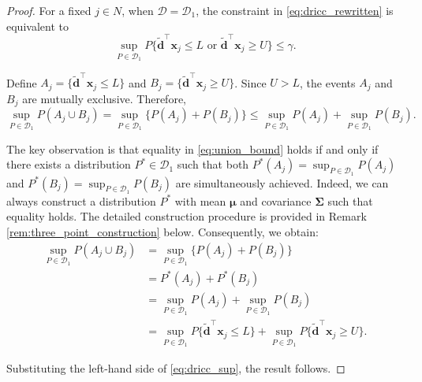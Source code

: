 \documentclass[preprint,12pt,authoryear]{elsarticle}
\begin{document}
\begin{proof}
For a fixed $j \in N$, when $\mathcal{D} = \mathcal{D}_1$, the constraint in \eqref{eq:dricc_rewritten} is equivalent to 
\begin{equation}
\sup_{P \in \mathcal{D}_1} P \{\widetilde{\mathbf{d}}^\top \mathbf{x}_j \leqslant L \text{ or } \widetilde{\mathbf{d}}^\top \mathbf{x}_j \geqslant U \} \leqslant \gamma. \label{eq:dricc_sup}
\end{equation}

Define $A_j = \{\widetilde{\mathbf{d}}^\top \mathbf{x}_j \leqslant L\}$ and $B_j = \{\widetilde{\mathbf{d}}^\top \mathbf{x}_j \geqslant U\}$. Since $U > L$, the events $A_j$ and $B_j$ are mutually exclusive. Therefore,
\begin{equation}
\sup_{P \in \mathcal{D}_1} P(A_j \cup B_j) = \sup_{P \in \mathcal{D}_1} \{P(A_j) + P(B_j)\} \leqslant \sup_{P \in \mathcal{D}_1} P(A_j) + \sup_{P \in \mathcal{D}_1} P(B_j).
\label{eq:union_bound}
\end{equation}

The key observation is that equality in \eqref{eq:union_bound} holds if and only if there exists a distribution $P^* \in \mathcal{D}_1$ such that both $P^*(A_j) = \sup_{P \in \mathcal{D}_1} P(A_j)$ and $P^*(B_j) = \sup_{P \in \mathcal{D}_1} P(B_j)$ are simultaneously achieved. Indeed, we can always construct a distribution $P^*$ with mean $\boldsymbol{\mu}$ and covariance $\boldsymbol{\Sigma}$ such that equality holds. The detailed construction procedure is provided in Remark \ref{rem:three_point_construction} below. Consequently, we obtain:
\begin{equation}
\begin{aligned}
    \sup_{P \in \mathcal{D}_1} P(A_j \cup B_j) &= \sup_{P \in \mathcal{D}_1} \{P(A_j) + P(B_j)\} \\ 
    &= P^*(A_j) + P^*(B_j)  \\
    &= \sup_{P \in \mathcal{D}_1} P(A_j) + \sup_{P \in \mathcal{D}_1} P(B_j) \\
    &= \sup_{P \in \mathcal{D}_1} P\{\widetilde{\mathbf{d}}^\top \mathbf{x}_j \leqslant L\} + \sup_{P \in \mathcal{D}_1} P\{\widetilde{\mathbf{d}}^\top \mathbf{x}_j \geqslant U\}.
\end{aligned}
\label{eq:union_bound_equality}
\end{equation}

Substituting the left-hand side of \eqref{eq:dricc_sup}, the result follows.
\end{proof}
\end{document}
